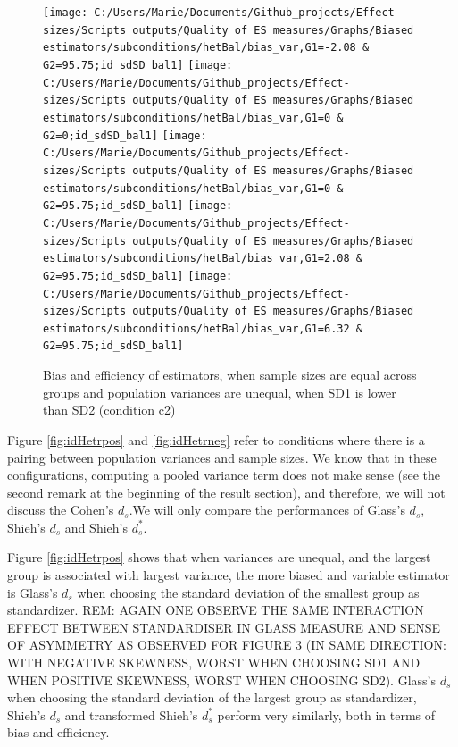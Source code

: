 \documentclass[
  man,floatsintext]{apa6}
\begin{document}
\begin{figure}

{\centering \texttt{[image: C:/Users/Marie/Documents/Github\_projects/Effect-sizes/Scripts outputs/Quality of ES measures/Graphs/Biased estimators/subconditions/hetBal/bias\_var,G1=-2.08 \& G2=95.75;id\_sdSD\_bal1]} \texttt{[image: C:/Users/Marie/Documents/Github\_projects/Effect-sizes/Scripts outputs/Quality of ES measures/Graphs/Biased estimators/subconditions/hetBal/bias\_var,G1=0 \& G2=0;id\_sdSD\_bal1]} \texttt{[image: C:/Users/Marie/Documents/Github\_projects/Effect-sizes/Scripts outputs/Quality of ES measures/Graphs/Biased estimators/subconditions/hetBal/bias\_var,G1=0 \& G2=95.75;id\_sdSD\_bal1]} \texttt{[image: C:/Users/Marie/Documents/Github\_projects/Effect-sizes/Scripts outputs/Quality of ES measures/Graphs/Biased estimators/subconditions/hetBal/bias\_var,G1=2.08 \& G2=95.75;id\_sdSD\_bal1]} \texttt{[image: C:/Users/Marie/Documents/Github\_projects/Effect-sizes/Scripts outputs/Quality of ES measures/Graphs/Biased estimators/subconditions/hetBal/bias\_var,G1=6.32 \& G2=95.75;id\_sdSD\_bal1]} 

}

\caption{Bias and efficiency of estimators, when sample sizes are equal across groups and population variances are unequal, when SD1 is lower than SD2 (condition c2)}\label{fig:idHetbal3}
\end{figure}

Figure \ref{fig:idHetrpos} and \ref{fig:idHetrneg} refer to conditions where there is a pairing between population variances and sample sizes. We know that in these configurations, computing a pooled variance term does not make sense (see the second remark at the beginning of the result section), and therefore, we will not discuss the Cohen's \(d_s\).We will only compare the performances of Glass's \(d_s\), Shieh's \(d_s\) and Shieh's \(d^*_s\).

Figure \ref{fig:idHetrpos} shows that when variances are unequal, and the largest group is associated with largest variance, the more biased and variable estimator is Glass's \(d_s\) when choosing the standard deviation of the smallest group as standardizer.
REM: AGAIN ONE OBSERVE THE SAME INTERACTION EFFECT BETWEEN STANDARDISER IN GLASS MEASURE AND SENSE OF ASYMMETRY AS OBSERVED FOR FIGURE 3 (IN SAME DIRECTION: WITH NEGATIVE SKEWNESS, WORST WHEN CHOOSING SD1 AND WHEN POSITIVE SKEWNESS, WORST WHEN CHOOSING SD2). Glass's \(d_s\) when choosing the standard deviation of the largest group as standardizer, Shieh's \(d_s\) and transformed Shieh's \(d^*_s\) perform very similarly, both in terms of bias and efficiency.
\end{document}
